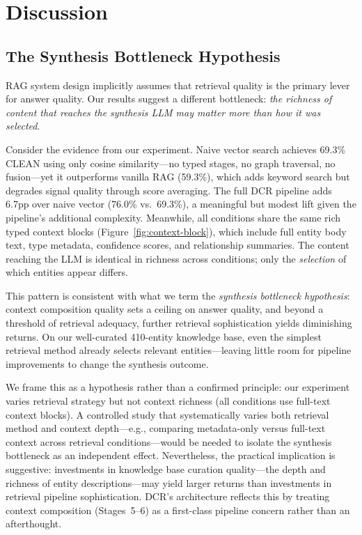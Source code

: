 \documentclass[11pt,a4paper]{article}
\begin{document}
\section{Discussion}
\label{sec:discussion}

\subsection{The Synthesis Bottleneck Hypothesis}

RAG system design implicitly assumes that retrieval quality is the primary lever for answer quality. Our results suggest a different bottleneck: \emph{the richness of content that reaches the synthesis LLM may matter more than how it was selected}.

Consider the evidence from our experiment. Naive vector search achieves 69.3\% CLEAN using only cosine similarity---no typed stages, no graph traversal, no fusion---yet it outperforms vanilla RAG (59.3\%), which adds keyword search but degrades signal quality through score averaging. The full DCR pipeline adds 6.7pp over naive vector (76.0\% vs.\ 69.3\%), a meaningful but modest lift given the pipeline's additional complexity. Meanwhile, all conditions share the same rich typed context blocks (Figure~\ref{fig:context-block}), which include full entity body text, type metadata, confidence scores, and relationship summaries. The content reaching the LLM is identical in richness across conditions; only the \emph{selection} of which entities appear differs.

This pattern is consistent with what we term the \emph{synthesis bottleneck hypothesis}: context composition quality sets a ceiling on answer quality, and beyond a threshold of retrieval adequacy, further retrieval sophistication yields diminishing returns. On our well-curated 410-entity knowledge base, even the simplest retrieval method already selects relevant entities---leaving little room for pipeline improvements to change the synthesis outcome.

We frame this as a hypothesis rather than a confirmed principle: our experiment varies retrieval strategy but not context richness (all conditions use full-text context blocks). A controlled study that systematically varies both retrieval method and context depth---e.g., comparing metadata-only versus full-text context across retrieval conditions---would be needed to isolate the synthesis bottleneck as an independent effect. Nevertheless, the practical implication is suggestive: investments in knowledge base curation quality---the depth and richness of entity descriptions---may yield larger returns than investments in retrieval pipeline sophistication. DCR's architecture reflects this by treating context composition (Stages~5--6) as a first-class pipeline concern rather than an afterthought.
\end{document}
